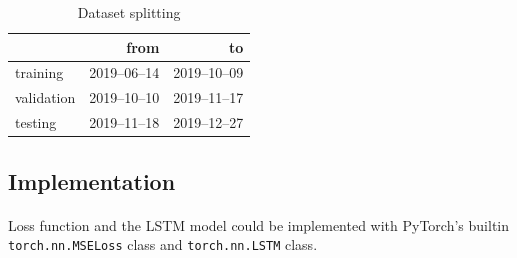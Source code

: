 \documentclass[12pt, letterpaper]{article}
\begin{document}
\begin{table}
    \centering
    \begin{tabular}{lrr}
        \toprule
                   &         from &           to \\
        \midrule
        training   & 2019--06--14 & 2019--10--09 \\
        validation & 2019--10--10 & 2019--11--17 \\
        testing    & 2019--11--18 & 2019--12--27 \\
        \bottomrule
    \end{tabular}
    \caption{Dataset splitting}%
    \label{table:split}
\end{table}

\subsection{Implementation}



\paragraph{}
Loss function and the LSTM model could be implemented with PyTorch's builtin \texttt{torch.nn.MSELoss} class and \texttt{torch.nn.LSTM} class.
\end{document}
